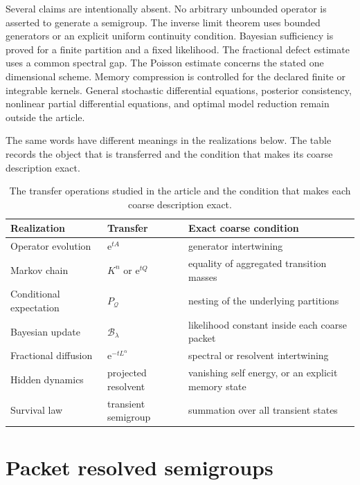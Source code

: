 \documentclass[11pt,letterpaper]{article}
\theoremstyle{plain}
\theoremstyle{plain}
\theoremstyle{plain}
\theoremstyle{definition}
\theoremstyle{definition}
\theoremstyle{definition}
\theoremstyle{definition}
\theoremstyle{definition}
\theoremstyle{remark}
\theoremstyle{remark}
\theoremstyle{remark}
\theoremstyle{remark}
\theoremstyle{remark}
\theoremstyle{remark}
\newcommand{\Bcal}{\mathcal B}
\newcommand{\e}{\mathrm e}
\let\KomorebiPrimitiveMathcal\mathcal
\renewcommand{\mathcal}[1]{{\KomorebiPrimitiveMathcal{#1}}}
\let\KomorebiPrimitivemathrm\mathrm
\renewcommand{\mathrm}[1]{{\KomorebiPrimitivemathrm{#1}}}
\begin{document}
Several claims are intentionally absent. No arbitrary unbounded operator is asserted to generate a semigroup. The inverse limit theorem uses bounded generators or an explicit uniform continuity condition. Bayesian sufficiency is proved for a finite partition and a fixed likelihood. The fractional defect estimate uses a common spectral gap. The Poisson estimate concerns the stated one dimensional scheme. Memory compression is controlled for the declared finite or integrable kernels. General stochastic differential equations, posterior consistency, nonlinear partial differential equations, and optimal model reduction remain outside the article.

The same words have different meanings in the realizations below. The table records the object that is transferred and the condition that makes its coarse description exact.

\begin{table}[t]
\centering
\small
\begin{tabular}{>{\raggedright\arraybackslash}p{}>{\raggedright\arraybackslash}p{}>{\raggedright\arraybackslash}p{}}
\toprule
Realization & Transfer & Exact coarse condition \\
\midrule
Operator evolution & $\e^{tA}$ & generator intertwining \\
Markov chain & $K^n$ or $\e^{tQ}$ & equality of aggregated transition masses \\
Conditional expectation & $P_{\mathcal Q}$ & nesting of the underlying partitions \\
Bayesian update & $\Bcal_\lambda$ & likelihood constant inside each coarse packet \\
Fractional diffusion & $\e^{-tL^\alpha}$ & spectral or resolvent intertwining \\
Hidden dynamics & projected resolvent & vanishing self energy, or an explicit memory state \\
Survival law & transient semigroup & summation over all transient states \\
\bottomrule
\end{tabular}
\caption{The transfer operations studied in the article and the condition that makes each coarse description exact.}
\label{extended:tab:transfer_dictionary}
\end{table}

\FloatBarrier
\section{Packet resolved semigroups}\label{extended:section:02}\label{extended:sec:packet_semigroups}
\end{document}
